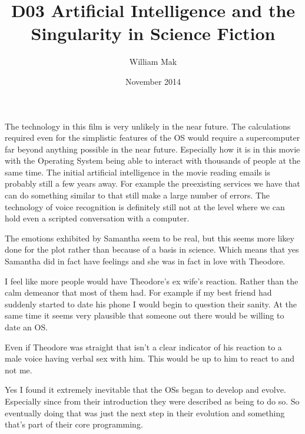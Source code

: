 \documentclass{article}
\title{D03 Artificial Intelligence and the Singularity in Science Fiction}
\author{William Mak}
\date{November 2014}
\begin{document}
\maketitle

The technology in this film is very unlikely in the near future. The
calculations required even for the simplistic features of the OS would require a
supercomputer far beyond anything possible in the near future. Especially how it
is in this movie with the Operating System being able to interact with thousands
of people at the same time. The initial artificial intelligence in the movie
reading emails is probably still a few years away. For example the preexisting
services we have that can do something similar to that still make a large number
of errors. The technology of voice recognition is definitely still not at the
level where we can hold even a scripted conversation with a computer. 

The emotions exhibited by Samantha seem to be real, but this seems more likey
done for the plot rather than because of a basis in science. Which means that
yes Samantha did in fact have feelings and she was in fact in love with
Theodore.

I feel like more people would have Theodore's ex wife's reaction. Rather than
the calm demeanor that most of them had. For example if my best friend had
suddenly started to date his phone I would begin to question their sanity. At
the same time it seems very plausible that someone out there would be willing to
date an OS.

Even if Theodore was straight that isn't a clear indicator of his reaction to a
male voice having verbal sex with him. This would be up to him to react to and
not me.

Yes I found it extremely inevitable that the OSs began to develop and evolve.
Especially since from their introduction they were described as being to do so.
So eventually doing that was just the next step in their evolution and something
that's part of their core programming.
\end{document}
